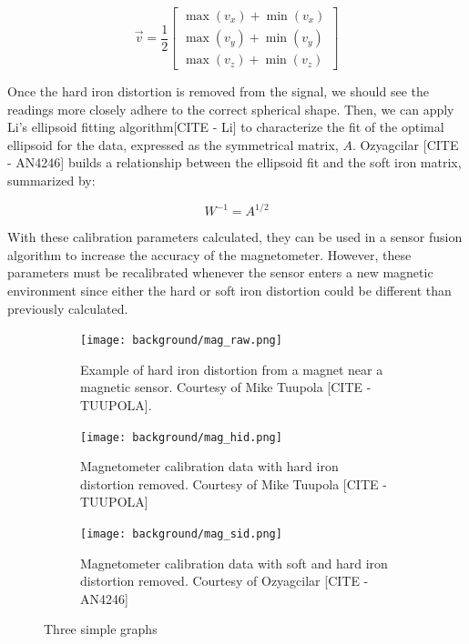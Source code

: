 \begin{equation} \label{eq:hard_iron_offset}
    \vec{v}=\frac{1}{2}
    \begin{bmatrix}
        \max(v_x)+\min(v_x) \\
        \max(v_y)+\min(v_y) \\
        \max(v_z)+\min(v_z)
    \end{bmatrix}
\end{equation}

Once the hard iron distortion is removed from the signal, we should see the readings more closely adhere to the correct spherical shape. 
Then, we can apply Li’s ellipsoid fitting algorithm[CITE - Li] to characterize the fit of the optimal ellipsoid for the data, expressed as the symmetrical matrix, $A$. 
Ozyagcilar [CITE - AN4246] builds a relationship between the ellipsoid fit and the soft iron matrix, summarized by:

\begin{equation} \label{eq:soft_iron_matrix}
    W^{-1}=A^{1/2}
\end{equation}

With these calibration parameters calculated, they can be used in a sensor fusion algorithm to increase the accuracy of the magnetometer. 
However, these parameters must be recalibrated whenever the sensor enters a new magnetic environment since either the hard or soft iron distortion could be different than previously calculated.

\begin{figure}
    \centering
    \begin{subfigure}[b]{0.3\textwidth}
        \centering
        \texttt{[image: background/mag\_raw.png]}
        \caption[Raw Magnetometer Readings]{Example of hard iron distortion from a magnet near a magnetic sensor. Courtesy of Mike Tuupola [CITE - TUUPOLA].}
        \label{fig:mag_raw}
    \end{subfigure}
    \hfill
    \begin{subfigure}[b]{0.3\textwidth}
        \centering
        \texttt{[image: background/mag\_hid.png]}
        \caption[Hard Iron Distortion Removed]{Magnetometer calibration data with hard iron distortion removed. Courtesy of Mike Tuupola [CITE - TUUPOLA]}
        \label{fig:mag_hid}
    \end{subfigure}
    \hfill
    \begin{subfigure}[b]{0.3\textwidth}
        \centering
        \texttt{[image: background/mag\_sid.png]}
        \caption[Soft Iron Distortion Removed]{Magnetometer calibration data with soft and hard iron distortion removed. Courtesy of Ozyagcilar [CITE - AN4246]}
        \label{fig:mag_sid}
    \end{subfigure}
       \caption{Three simple graphs}
       \label{fig:magnetometer_corrections}
\end{figure}


